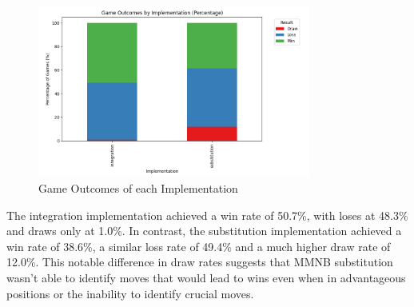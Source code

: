 \begin{figure}[H]
    \centering
    \includegraphics[width=0.8\textwidth]{images/plots/implementation/Implementation_vs_win_rate.png}
    \caption{Game Outcomes of each Implementation}
    \label{fig: implementation_vs_win_rate}
\end{figure}












The integration implementation achieved a win rate of 50.7\%, with loses at 48.3\% and draws only at 1.0\%. In contrast, the substitution implementation achieved a win rate of 38.6\%, a similar loss rate of 49.4\% and a much higher draw rate of 12.0\%. This notable difference in draw rates suggests that MMNB substitution wasn't able to identify moves that would lead to wins even when in advantageous positions or the inability to identify crucial moves. 

